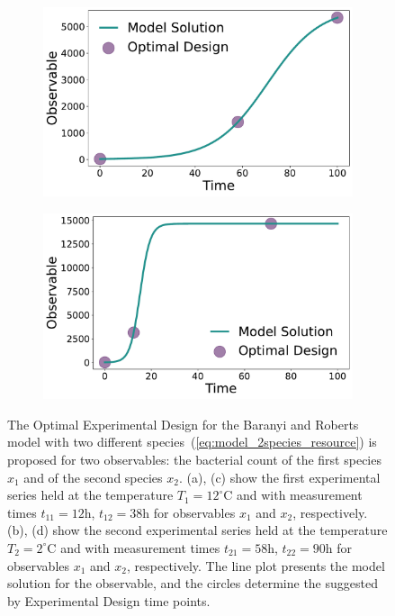 \documentclass[graybox]{svmult}
\begin{document}
\begin{figure}[H]
\begin{subfigure}{.5\textwidth}
        \includegraphics[scale=0.255]{Figures/Observable_Results_baranyi_roberts_ode_fisher_determinant_2species_rel_sensit_cont_2times_2temps_000_x_01.pdf}
    \end{subfigure}
    \begin{subfigure}{.5\textwidth}
        \centering
        \includegraphics[scale=0.255]{Figures/Observable_Results_baranyi_roberts_ode_fisher_determinant_2species_rel_sensit_cont_2times_2temps_001_x_01.pdf}
    \end{subfigure} 
    \caption{{\footnotesize
    The Optimal Experimental Design for the Baranyi and Roberts model with two different species~(\ref{eq:model_2species_resource}) is proposed for two observables: the bacterial count of the first species $x_1$ and of the second species $x_2$.
    (a), (c) show the first experimental series held at the temperature $T_1=12^\circ$C and with measurement times $t_{11}=12$h, $t_{12}=38$h for observables $x_1$ and $x_2$, respectively.
    (b), (d) show the second experimental series held at the temperature $T_2=2^\circ$C and with measurement times $t_{21}=58$h, $t_{22}=90$h for observables $x_1$ and $x_2$, respectively.
    The line plot presents the model solution for the observable, and the circles determine the suggested by Experimental Design time points.}}
    \label{fig:baranyi_roberts_2species_observable}
\end{figure}
\end{document}
